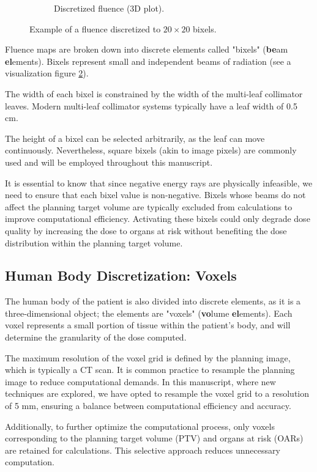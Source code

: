 \begin{figure}
\begin{subfigure}[c]{0.45\textwidth}
		\caption{Discretized fluence (3D plot).}
		\label{fig:fluence_bixel_3D_discrete}
	\end{subfigure}
	\caption{Example of a fluence discretized to $20 \times 20$ bixels.}
	\label{fig:fluence_bixel}
\end{figure}

Fluence maps are broken down into discrete elements called "bixels" (\textbf{be}am \textbf{el}ements).
Bixels represent small and independent beams of radiation (see a visualization figure \ref{fig:fluence_bixel}).

The width of each bixel is constrained by the width of the multi-leaf collimator leaves.
Modern multi-leaf collimator systems typically have a leaf width of 0.5 cm.

The height of a bixel can be selected arbitrarily, as the leaf can move continuously.
Nevertheless, square bixels (akin to image pixels) are commonly used and will be employed throughout this manuscript.

It is essential to know that since negative energy rays are physically infeasible, we need to ensure that each bixel value is non-negative.
Bixels whose beams do not affect the planning target volume are typically excluded from calculations to improve computational efficiency.
Activating these bixels could only degrade dose quality by increasing the dose to organs at risk without benefiting the dose distribution within the planning target volume.

\subsection[Voxels]{Human Body Discretization: Voxels}
The human body of the patient is also divided into discrete elements, as it is a three-dimensional object; the elements are "voxels" (\textbf{vo}lume \textbf{el}ements).
Each voxel represents a small portion of tissue within the patient's body, and will determine the granularity of the dose computed.

The maximum resolution of the voxel grid is defined by the planning image, which is typically a CT scan.
It is common practice to resample the planning image to reduce computational demands.
In this manuscript, where new techniques are explored, we have opted to resample the voxel grid to a resolution of 5 mm, ensuring a balance between computational efficiency and accuracy.

Additionally, to further optimize the computational process, only voxels corresponding to the planning target volume (PTV) and organs at risk (OARs) are retained for calculations.
This selective approach reduces unnecessary computation.

